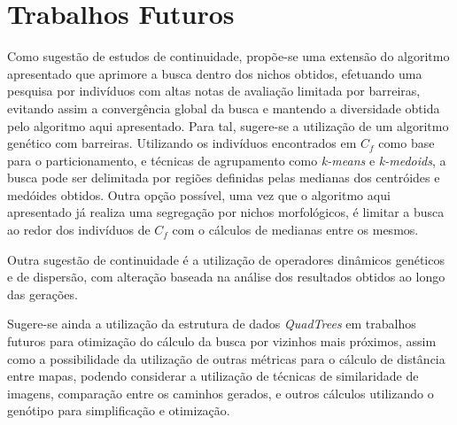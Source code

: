 \section{Trabalhos Futuros}
\label{trabalhos_futuros}

     
  

Como sugestão de estudos de continuidade, propõe-se uma extensão do algoritmo apresentado que aprimore a busca dentro dos nichos obtidos, efetuando uma pesquisa por  indivíduos com altas notas de avaliação limitada por barreiras, evitando assim a convergência global da busca e mantendo a diversidade obtida pelo algoritmo aqui apresentado. Para tal, sugere-se a utilização de um algoritmo genético com barreiras. Utilizando os indivíduos encontrados em $C_f$ como base para o particionamento, e técnicas de agrupamento como \emph{k-means} e \emph{k-medoids}, a busca pode ser delimitada por regiões definidas pelas medianas dos centróides e medóides obtidos. Outra opção possível, uma vez que o algoritmo aqui apresentado já realiza uma segregação por nichos morfológicos, é limitar a busca ao redor dos indivíduos de $C_f$ com o cálculos de medianas entre os mesmos.

Outra sugestão de continuidade é a utilização de operadores dinâmicos genéticos e de dispersão, com alteração baseada na análise dos resultados obtidos ao longo das gerações.

Sugere-se ainda a utilização da estrutura de dados \emph{QuadTrees} em trabalhos futuros para otimização do cálculo da busca por vizinhos mais próximos, assim como a possibilidade da utilização de outras métricas para o cálculo de distância entre mapas, podendo considerar a utilização de técnicas de similaridade de imagens, comparação entre os caminhos gerados, e outros cálculos utilizando o genótipo para simplificação e otimização.

